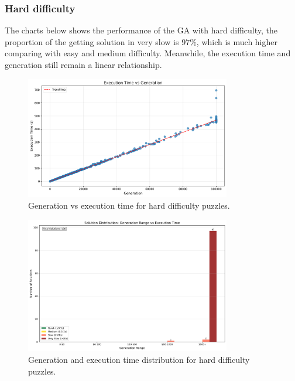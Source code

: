 \subsubsection{Hard difficulty}

The charts below shows the performance of the GA with hard difficulty, the proportion of the getting solution in very slow is $97\%$, which is much higher comparing with easy and medium difficulty.
Meanwhile, the execution time and generation still remain a linear relationship.

\begin{figure}[H]
\centering
\includegraphics[width=0.8\textwidth]{resources/generation_vs_execution_time_hard.png}
\caption{Generation vs execution time for hard difficulty puzzles.}
\label{fig:generation_vs_execution_time_hard}
\end{figure}

\begin{figure}[H]
\centering
\includegraphics[width=0.8\textwidth]{resources/generation_execution_time_bars_hard.png}
\caption{Generation and execution time distribution for hard difficulty puzzles.}
\label{fig:generation_execution_time_bars_hard}
\end{figure}

